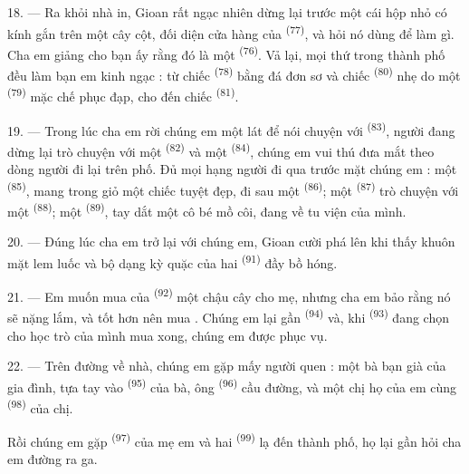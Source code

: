 18. --- Ra khỏi nhà in, Gioan rất ngạc nhiên dừng lại trước một cái hộp nhỏ có kính gắn
trên một cây cột, đối diện cửa hàng của 
\textsuperscript{(77)}, và hỏi nó dùng để làm gì. Cha em giảng cho bạn ấy rằng đó là một
 \textsuperscript{(76)}. Vả lại, mọi thứ trong thành phố đều làm
bạn em kinh ngạc : từ chiếc  \textsuperscript{(78)} bằng đá
đơn sơ và chiếc  \textsuperscript{(80)} nhẹ do một
 \textsuperscript{(79)} mặc chế phục đạp, cho đến chiếc 
\textsuperscript{(81)}.

19. --- Trong lúc cha em rời chúng em một lát để nói chuyện với 
\textsuperscript{(83)}, người đang dừng lại trò chuyện với một 
\textsuperscript{(82)} và một  \textsuperscript{(84)}, chúng em vui
thú đưa mắt theo dòng người đi lại trên phố. Đủ mọi hạng người đi qua trước mặt chúng em
: một  \textsuperscript{(85)}, mang trong giỏ một chiếc
 tuyệt đẹp, đi sau một 
\textsuperscript{(86)}; một  \textsuperscript{(87)} trò
chuyện với một  \textsuperscript{(88)}; một 
\textsuperscript{(89)}, tay dắt một cô bé mồ côi, đang về tu viện của mình.

\VUsaut{3.0mm}

20. --- Đúng lúc cha em trở lại với chúng em, Gioan cười phá lên khi thấy khuôn mặt lem
luốc và bộ dạng kỳ quặc của hai  \textsuperscript{(91)} đầy
bồ hóng.

21. --- Em muốn mua của  \textsuperscript{(92)} một chậu cây cho
mẹ, nhưng cha em bảo rằng nó sẽ nặng lắm, và tốt hơn nên mua . Chúng em lại
gần  \textsuperscript{(94)} và, khi 
\textsuperscript{(93)} đang chọn cho học trò của mình mua xong, chúng em được phục vụ.

22. --- Trên đường về nhà, chúng em gặp mấy người quen : một bà bạn già của gia đình,
tựa tay vào  \textsuperscript{(95)} của bà, ông 
\textsuperscript{(96)} cầu đường, và một chị họ của em cùng 
\textsuperscript{(98)} của chị.

Rồi chúng em gặp  \textsuperscript{(97)} của mẹ em và hai  \textsuperscript{(99)} lạ đến thành phố, họ lại gần hỏi cha em đường ra ga.
\VUsaut{6.0mm}
\VUfilet{22mm}
